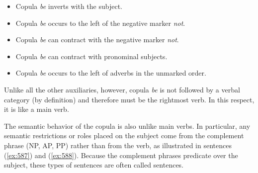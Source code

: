 \begin{itemize} 
\item Copula {\it be} inverts with the subject. 
\beginsentences
{}\label{ex:582} 
\endsentences

 
\item Copula {\it be} occurs to the left of the negative marker {\it not}. 
\beginsentences
{}\label{ex:583} 
\endsentences

 
\item Copula {\it be} can contract with the negative marker {\it not}. 
\beginsentences
{}\label{ex:584} 
\endsentences

 
\item Copula {\it be} can contract with pronominal subjects. 
\beginsentences
{}\label{ex:585} 
\endsentences

 
\item Copula {\it be} occurs to the left of adverbs in the unmarked order. 
\beginsentences
{}\label{ex:586} 
\endsentences

\end{itemize} 
 
Unlike all the other auxiliaries, however, copula {\it be} is not followed by 
a verbal category (by definition) and therefore must be the rightmost verb.  In 
this respect, it is like a main verb. 
 
The semantic behavior of the copula is also unlike main verbs.  In particular, 
any semantic restrictions or roles placed on the subject come from the 
complement phrase (NP, AP, PP) rather than from the verb, as illustrated in 
sentences ({\ref{ex:587}}) and ({\ref{ex:588}}).  Because the complement phrases predicate 
over the subject, these types of sentences are often called 
 sentences. 
 
